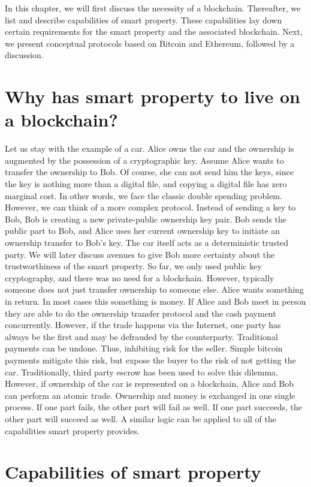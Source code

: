 In this chapter, we will first discuss the necessity of a blockchain. Thereafter, we list and describe capabilities of smart property. These capabilities lay down certain requirements for the smart property and the associated blockchain. Next, we present conceptual protocols based on Bitcoin and Ethereum, followed by a discussion. 

\section{Why has smart property to live on a blockchain?}

Let us stay with the example of a car. Alice owns the car and the ownership is augmented by the possession of a cryptographic key. Assume Alice wants to transfer the ownership to Bob. Of course, she can not send him the keys, since the key is nothing more than a digital file, and copying a digital file has zero marginal cost. In other words, we face the classic double spending problem. However, we can think of a more complex protocol. Instead of sending a key to Bob, Bob is creating a new private-public ownership key pair. Bob sends the public part to Bob, and Alice uses her current ownership key to initiate an ownership transfer to Bob's key. The car itself acts as a deterministic trusted party. We will later discuss avenues to give Bob more certainty about the trustworthiness of the smart property.
So far, we only used public key cryptography, and there was no need for a blockchain. However, typically someone does not just transfer ownership to someone else. Alice wants something in return. In most cases this something is money. If Alice and Bob meet in person they are able to do the ownership transfer protocol and the cash payment concurrently. However, if the trade happens via the Internet, one party has always be the first and may be defrauded by the counterparty. Traditional payments can be undone. Thus, inhibiting risk for the seller. Simple bitcoin payments mitigate this risk, but expose the buyer to the risk of not getting the car. Traditionally, third party escrow has been used to solve this dilemma.
However, if ownership of the car is represented on a blockchain, Alice and Bob can perform an atomic trade. Ownership and money is exchanged in one single process. If one part fails, the other part will fail as well. If one part succeeds, the other part will succeed as well. A similar logic can be applied to all of the capabilities smart property provides.

\section{Capabilities of smart property}

